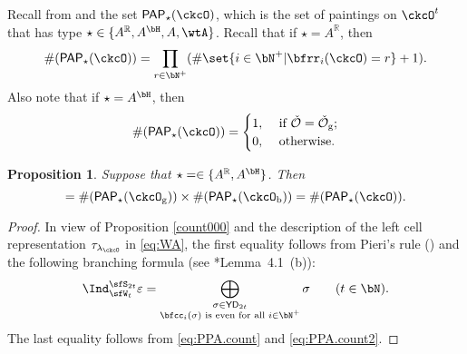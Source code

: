 \documentclass[12pt,a4paper]{amsart}
\def\Im{\operatorname{Im}}
\newcommand{\CK}{{\mathcal {K}}}
\newcommand{\CO}{{\mathcal {O}}}
\newcommand{\sgn}{\operatorname{sgn}}
\newcommand{\R}{\mathbb R}
\numberwithin{equation}{section}
\newtheorem{prop}[thm]{Proposition}
\theoremstyle{remark}
\def\YD{\mathsf{YD}}
\def\lamck{\lambda_\ckcO}
\def\Wint#1{W_{[#1]}}
\def\Cint#1{\Coh_{[#1]}}
\def\PP{\mathsf{PAP}}
\def\Im{\mathrm{Im}}
\def\Coh{\mathrm{Coh}}
\def\ckcOb{\ckcO_{\mathrm b}}
\def\ckcOg{\ckcO_{\mathrm g}}
\begin{document}
Recall from  and   the set $\PP_{\star}(\ckcO)$, which is the set of paintings on $\ckcO^{t}$ that has type $\star\in \{A^\R, A^\bH, A, \wtA\}$.
Recall that if $\star=A^\R$, then
\begin{equation}\label{eq:PPA.count}
  \#(\PP_{\star}(\ckcO)) = \prod_{r\in \bN^{+}} (\#\set{i\in \bN^{+}| \bfrr_{i}(\ckcO)=r}+1).
\end{equation}
Also note that
if $\star=A^\bH$, then
\begin{equation}\label{eq:PPA.count2}
  \#(\PP_{\star}(\ckcO)) = \begin{cases}
   1,
    & \text{ if $\check \CO=\check \CO_\mathrm g$;}  \\
      0, & \text{ otherwise.} \\
    \end{cases}
\end{equation}

\begin{prop} \label{lem:GL.count2}
  Suppose that $\star=\in\{A^\R, A^\bH\}$.  Then
   \begin{equation*}%
    [\tau_{\lamck}: \Cint{\Lambda}(\CK'(G))] = \# (\PP_{\star}(\ckcOg))\times
    \# (\PP_{\star}(\ckcOb)) = \# (\PP_{\star}(\ckcO)).
  \end{equation*}
\end{prop}
\begin{proof}
  In view of Proposition \ref{count000} and the description of the left cell representation $\tau_{\lamck}$ in \eqref{eq:WA}, the  first equality  follows from  Pieri's rule (\cite[Corollary 9.2.4]{GW}) and
  the following branching formula (see \cite{BV.W}*{Lemma~4.1~(b)}):
\begin{equation}\label{IndFor}
  \Ind_{\sfW_{t}}^{\sfS_{2t}} \varepsilon = \bigoplus_{\substack{\sigma\in \YD_{2t}\\
      \bfcc_{i}(\sigma) \text{ is even for all }i\in \bN^+}} \sigma\qquad (t\in \bN).
\end{equation}
The last equality
  follows from \eqref{eq:PPA.count} and \eqref{eq:PPA.count2}.
\end{proof}
\end{document}

